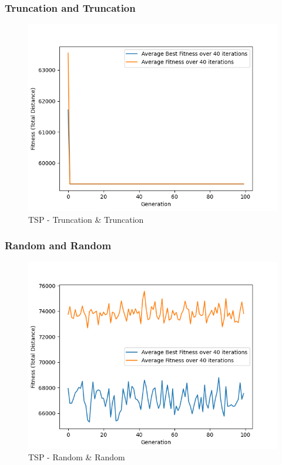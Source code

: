 \documentclass[11pt, letterpaper]{article}
\begin{document}
\subsubsection {Truncation and Truncation}

\begin{figure}[H]
    \centering
    \includegraphics[scale = 0.6]{images/tsp_tr_tr.png}
    \caption {TSP - Truncation \& Truncation}
    \label {fig:tpsTT}
\end{figure}
\subsubsection {Random and Random}
\begin{figure}[H]
    \centering
    \includegraphics[scale = 0.6]{images/tsp_rd_rd.png}
    \caption {TSP - Random \& Random}
    \label {fig:tpsRR}
\end{figure}
\end{document}
